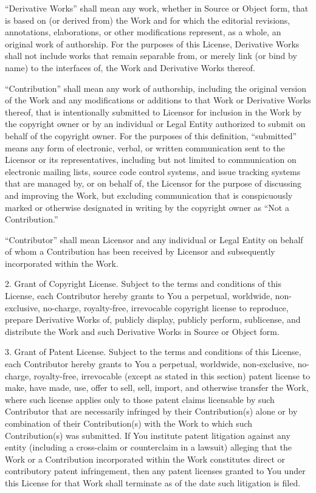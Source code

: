 \documentclass[]{article}
\begin{document}
``Derivative Works'' shall mean any work, whether in Source or Object
form, that is based on (or derived from) the Work and for which the
editorial revisions, annotations, elaborations, or other modifications
represent, as a whole, an original work of authorship. For the purposes
of this License, Derivative Works shall not include works that remain
separable from, or merely link (or bind by name) to the interfaces of,
the Work and Derivative Works thereof.

``Contribution'' shall mean any work of authorship, including the
original version of the Work and any modifications or additions to that
Work or Derivative Works thereof, that is intentionally submitted to
Licensor for inclusion in the Work by the copyright owner or by an
individual or Legal Entity authorized to submit on behalf of the
copyright owner. For the purposes of this definition, ``submitted''
means any form of electronic, verbal, or written communication sent to
the Licensor or its representatives, including but not limited to
communication on electronic mailing lists, source code control systems,
and issue tracking systems that are managed by, or on behalf of, the
Licensor for the purpose of discussing and improving the Work, but
excluding communication that is conspicuously marked or otherwise
designated in writing by the copyright owner as ``Not a Contribution.''

``Contributor'' shall mean Licensor and any individual or Legal Entity
on behalf of whom a Contribution has been received by Licensor and
subsequently incorporated within the Work.

2. Grant of Copyright License. Subject to the terms and conditions of
this License, each Contributor hereby grants to You a perpetual,
worldwide, non-exclusive, no-charge, royalty-free, irrevocable copyright
license to reproduce, prepare Derivative Works of, publicly display,
publicly perform, sublicense, and distribute the Work and such
Derivative Works in Source or Object form.

3. Grant of Patent License. Subject to the terms and conditions of this
License, each Contributor hereby grants to You a perpetual, worldwide,
non-exclusive, no-charge, royalty-free, irrevocable (except as stated in
this section) patent license to make, have made, use, offer to sell,
sell, import, and otherwise transfer the Work, where such license
applies only to those patent claims licensable by such Contributor that
are necessarily infringed by their Contribution(s) alone or by
combination of their Contribution(s) with the Work to which such
Contribution(s) was submitted. If You institute patent litigation
against any entity (including a cross-claim or counterclaim in a
lawsuit) alleging that the Work or a Contribution incorporated within
the Work constitutes direct or contributory patent infringement, then
any patent licenses granted to You under this License for that Work
shall terminate as of the date such litigation is filed.
\end{document}
